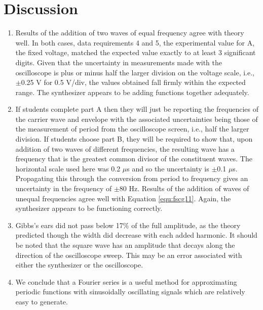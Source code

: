 \section{Discussion}
\begin{enumerate}[resume]
\item Results of the addition of two waves of equal frequency agree with theory well. In both cases, data requirements 4 and 5, the experimental value for A, the fixed voltage, matched the expected value exactly to at least 3 significant digits. Given that the uncertainty in measurements made with the oscilloscope is plus or minus half the larger division on the voltage scale, i.e., $\pm$0.25 V for 0.5 V/div, the values obtained fall firmly within the expected range. The synthesizer appears to be adding functions together adequately.

\item If students complete part A then they will just be reporting the frequencies of the carrier wave and envelope with the associated uncertainties being those of the measurement of period from the oscilloscope screen, i.e., half the larger division. If students choose part B, they will be required to show that, upon addition of two waves of different frequencies, the resulting wave has a frequency that is the greatest common divisor of the constituent waves. The horizontal scale used here was 0.2 $\mu$s and so the uncertainty is $\pm$0.1 $\mu$s. Propagating this through the conversion from period to frequency gives an uncertainty in the frequency of $\pm$80 Hz. Results of the addition of waves of unequal frequencies agree well with Equation \ref{equ:fscg11}. Again, the synthesizer appears to be functioning correctly.

\item Gibbs's ears did not pass below 17\% of the full amplitude, as the theory predicted though the width did decrease with each added harmonic. It should be noted that the square wave has an amplitude that decays along the direction of the oscilloscope sweep. This may be an error associated with either the synthesizer or the oscilloscope.

\item We conclude that a Fourier series is a useful method for approximating periodic functions with sinusoidally oscillating signals which are relatively easy to generate.


\end{enumerate}

\AtEndDocument{\clearpage\ifodd\value{page}\else\null\clearpage\fi} %



